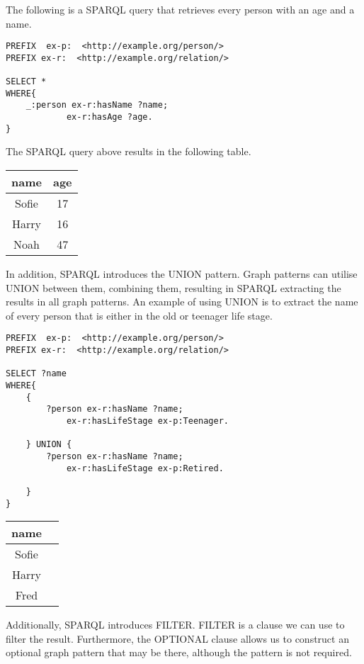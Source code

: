 \para
The following is a SPARQL query that retrieves every person with an age and a name. 

\para
\begin{lstlisting}[frame=single, language=turtle, frame=none]
PREFIX  ex-p:  <http://example.org/person/> 
PREFIX ex-r:  <http://example.org/relation/> 

SELECT *
WHERE{
    _:person ex-r:hasName ?name;
            ex-r:hasAge ?age.
}
\end{lstlisting}

\para
The SPARQL query above results in the following table. 

\para
\begin{tabular}{@{}cc@{}}
    \toprule
    name & age  \\ \midrule
    Sofie & 17 \\ 
    Harry & 16 \\ 
    Noah  & 47 \\ \bottomrule
\end{tabular}

\para 
In addition, SPARQL introduces the UNION pattern. Graph patterns can utilise UNION between them, combining them, resulting in SPARQL extracting the results in all graph patterns. An example of using UNION is to extract the name of every person that is either in the old or teenager life stage.

\para
\begin{lstlisting}[frame=single, language=turtle, frame=none]
PREFIX  ex-p:  <http://example.org/person/> 
PREFIX ex-r:  <http://example.org/relation/> 

SELECT ?name
WHERE{
    {
        ?person ex-r:hasName ?name;
            ex-r:hasLifeStage ex-p:Teenager.

    } UNION {
        ?person ex-r:hasName ?name;
            ex-r:hasLifeStage ex-p:Retired.

    }
}
\end{lstlisting}

\para
\begin{tabular}{@{}cc@{}}
    \toprule
    name & \\ \midrule
    Sofie \\ 
    Harry \\ 
    Fred  \\ \bottomrule
\end{tabular}


\para
Additionally, SPARQL introduces FILTER. FILTER is a clause we can use to filter the result. Furthermore, the OPTIONAL clause allows us to construct an optional graph pattern that may be there, although the pattern is not required.

